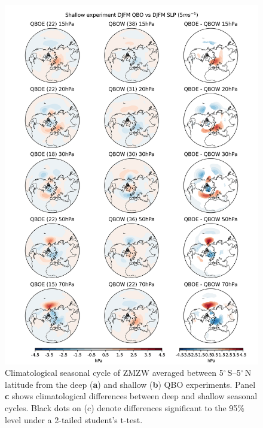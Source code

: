 \begin{figure}[h!]
\begin{center}
\noindent\includegraphics[width = \linewidth]{Figures/Figures-deepQBO/SLP_composites_QBO_phases_s_DJFMQBO_vs_DJFM_70hPa_5thresh.png}
\caption[Climatological seasonal cycle of equatorial ZMZW in QBO experiments]{Climatological seasonal cycle of ZMZW averaged between 5$^{\circ}$\,S--5$^{\circ}$\,N latitude from the deep (\textbf{a}) and shallow (\textbf{b}) QBO experiments. Panel \textbf{c} shows climatological differences between deep and shallow seasonal cycles. Black dots on (c) denote differences significant to the 95\% level under a 2-tailed student's t-test.}
\label{fig:experiment_SAOs}
\end{center}
\end{figure}


